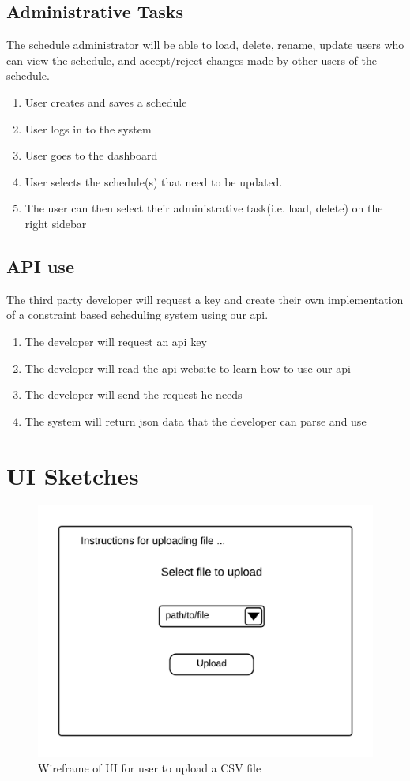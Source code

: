 \documentclass{extarticle}
\begin{document}
  
\subsection{Administrative Tasks}
The schedule administrator will be able to load, delete, rename, update users who can view the schedule, and accept/reject 
changes made by other users of the schedule.
\begin{enumerate}
\item User creates and saves a schedule
\item User logs in to the system
\item User goes to the dashboard
\item User selects the schedule(s) that need to be updated.
\item The user can then select their administrative task(i.e. load, delete) on the right sidebar
\end{enumerate}


\subsection{API use}
The third party developer will request a key and create their own implementation of a constraint based scheduling 
system using our api.

\begin{enumerate}
\item The developer will request an api key
\item The developer will read the api website to learn how to use our api
\item The developer will send the request he needs
\item The system will return json data that the developer can parse and use
\end{enumerate}

\appendix
\section{UI Sketches}

\begin{figure}[h!]
\label{fig:upload_csv}
\centering
\includegraphics[width=1.0\textwidth]{upload_page_wireframe}
\caption{Wireframe of UI for user to upload a CSV file}
\end{figure}
\end{document}
